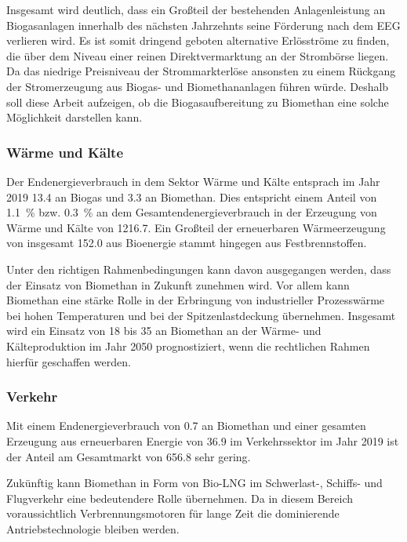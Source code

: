 Insgesamt wird deutlich, dass ein Großteil der bestehenden Anlagenleistung an Biogasanlagen innerhalb des nächsten Jahrzehnts seine Förderung nach dem \gls{EEG} verlieren wird. Es ist somit dringend geboten alternative Erlösströme zu finden, die über dem Niveau einer reinen Direktvermarktung an der Strombörse liegen. Da das niedrige Preisniveau der Strommarkterlöse ansonsten zu einem Rückgang der Stromerzeugung aus Biogas- und Biomethananlagen führen würde. Deshalb soll diese Arbeit aufzeigen, ob die Biogasaufbereitung zu Biomethan eine solche Möglichkeit darstellen kann.


\subsubsection{Wärme und Kälte}

Der Endenergieverbrauch in dem Sektor Wärme und Kälte entsprach im Jahr 2019 \SI{13.4}{\twh} an Biogas und \SI{3.3}{\twh} an Biomethan. Dies entspricht einem Anteil von \SI{1.1}{\percent} bzw. \SI{0.3}{\percent} an dem Gesamtendenergieverbrauch in der Erzeugung von Wärme und Kälte von \SI{1216.7}{\twh}. Ein Großteil der erneuerbaren Wärmeerzeugung von insgesamt \SI{152.0}{\twh} aus Bioenergie stammt hingegen aus Festbrennstoffen. \parencite{BWE2020}\smallskip

Unter den richtigen Rahmenbedingungen kann davon ausgegangen werden, dass der Einsatz von Biomethan in Zukunft zunehmen wird. Vor allem kann Biomethan eine stärke Rolle in der Erbringung von industrieller Prozesswärme bei hohen Temperaturen und bei der Spitzenlastdeckung übernehmen. Insgesamt wird ein Einsatz von \SI{18}{\twh} bis \SI{35}{\twh} an Biomethan an der Wärme- und Kälteproduktion im Jahr 2050 prognostiziert, wenn die rechtlichen Rahmen hierfür geschaffen werden. \parencite{dena2017}


\subsubsection{Verkehr}

Mit einem Endenergieverbrauch von \SI{0.7}{\twh} an Biomethan und einer gesamten Erzeugung aus erneuerbaren Energie von \SI{36.9}{\twh} im Verkehrssektor im Jahr 2019 ist der Anteil am Gesamtmarkt von \SI{656.8}{\twh} sehr gering. \parencite{BWE2020} \smallskip

Zukünftig kann Biomethan in Form von Bio-\gls{LNG} im Schwerlast-, Schiffs- und Flugverkehr eine bedeutendere Rolle übernehmen. Da in diesem Bereich voraussichtlich Verbrennungsmotoren für lange Zeit die dominierende Antriebstechnologie bleiben werden. \parencite{dena2017}